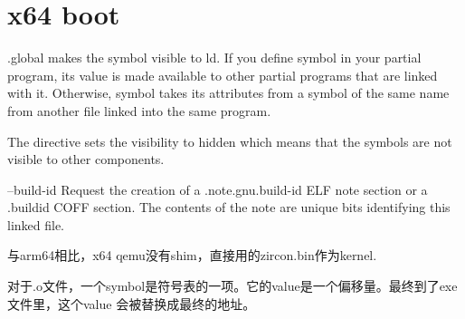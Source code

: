 \section{x64 boot}

.global makes the symbol visible to ld. If you define symbol in your partial
program, its value is made available to other partial programs that are linked
with it. Otherwise, symbol takes its attributes from a symbol of the same name
from another file linked into the same program. 

The directive sets the visibility to hidden which means that the symbols are
not visible to other components.

--build-id Request the creation of a .note.gnu.build-id ELF note section or a
.buildid COFF section. The contents of the note are unique bits identifying this
linked file.

与arm64相比，x64 qemu没有shim，直接用的zircon.bin作为kernel.

对于.o文件，一个symbol是符号表的一项。它的value是一个偏移量。最终到了exe文件里，这个value
会被替换成最终的地址。

